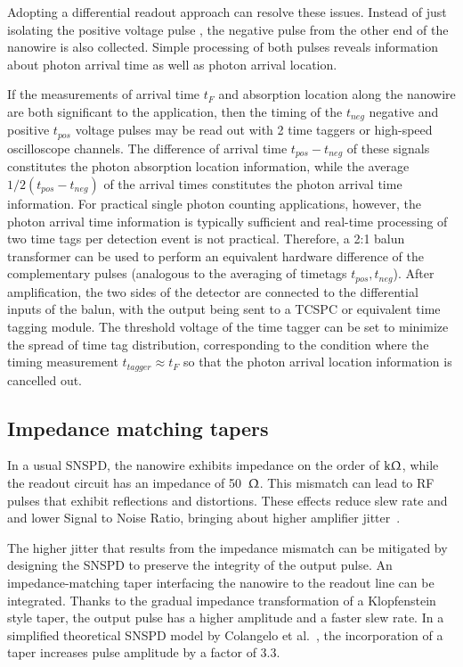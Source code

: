 \documentclass[11pt]{caltech_thesis} %
\begin{document}
Adopting a differential readout approach can resolve these issues. Instead of just isolating the positive voltage pulse , the negative pulse from the other end of the nanowire is also collected. Simple processing of both pulses reveals information about photon arrival time as well as photon arrival location.

If the measurements of arrival time $t_F$ and absorption location along the nanowire are both significant to the application, then the timing of the $t_{neg}$ negative and positive $t_{pos}$ voltage pulses may be read out with 2 time taggers or high-speed oscilloscope channels. The difference of arrival time $t_{pos} - t_{neg}$ of these signals constitutes the photon absorption location information, while the average $1/2(t_{pos} - t_{neg})$ of the arrival times constitutes the photon arrival time information. For practical single photon counting applications, however, the photon arrival time information is typically sufficient and real-time processing of two time tags per detection event is not practical. Therefore, a 2:1 balun transformer can be used to perform an equivalent hardware difference of the complementary pulses (analogous to the averaging of timetags $t_{pos}, t_{neg}$). After amplification, the two sides of the detector are connected to the differential inputs of the balun, with the output being sent to a TCSPC or equivalent time tagging module. The threshold voltage of the time tagger can be set to minimize the spread of time tag distribution, corresponding to the condition where the timing measurement $t_{tagger} \approx t_F$ so that the photon arrival location information is cancelled out.

\hypertarget{impedance-matching-tapers}{%
\subsection{Impedance matching tapers}\label{impedance-matching-tapers}}

In a usual SNSPD, the nanowire exhibits impedance on the order of $\mathrm{k} \Upomega$, while the readout circuit has an impedance of 50~$\Upomega$. This mismatch can lead to RF pulses that exhibit reflections and distortions. These effects reduce slew rate and and lower Signal to Noise Ratio, bringing about higher amplifier jitter~\autocite{Korzh2020,santavicca2019jitter}.

The higher jitter that results from the impedance mismatch can be mitigated by designing the SNSPD to preserve the integrity of the output pulse. An impedance-matching taper interfacing the nanowire to the readout line can be integrated. Thanks to the gradual impedance transformation of a Klopfenstein style taper, the output pulse has a higher amplitude and a faster slew rate. In a simplified theoretical SNSPD model by Colangelo et al.~\autocite{Colangelo2023}, the incorporation of a taper increases pulse amplitude by a factor of 3.3.
\end{document}
